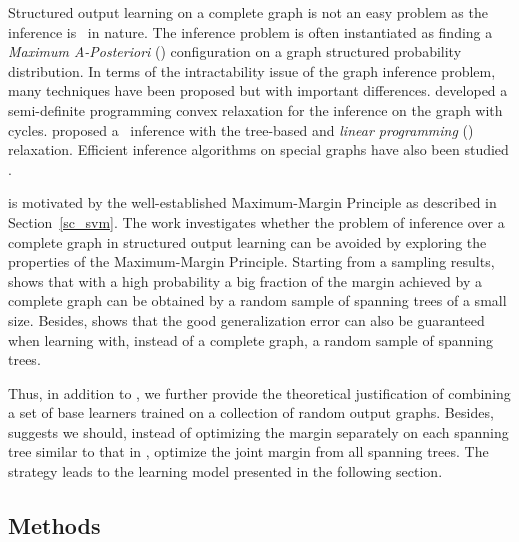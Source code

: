 {Structured output learning on a complete graph is not an easy problem as the inference is \nphard\ in nature.
The inference problem is often instantiated as finding a \textit{Maximum A-Posteriori} (\map) configuration on a graph structured probability distribution.
In terms of the intractability issue of the graph inference problem, many techniques have been proposed but with important differences.
\citet{Jordan04semiefinite} developed a semi-definite programming convex relaxation for the inference on the graph with cycles.
\citet{Wainwright05map} proposed a \map\ inference with the tree-based and \textit{linear programming} (\lp) relaxation.
Efficient inference algorithms on special graphs have also been studied \citep{Globerson07approximate}.

 is motivated by the well-established Maximum-Margin Principle as described in Section~\ref{sc_svm}.
The work investigates whether the problem of inference over a complete graph in structured output learning can be avoided by exploring the properties of the Maximum-Margin Principle.
Starting from a sampling results,  shows that with a high probability a big fraction of the margin achieved by a complete graph can be obtained by a random sample of spanning trees of a small size.
Besides,  shows that the good generalization error can also be guaranteed when learning with, instead of a complete graph, a random sample of spanning trees.

Thus, in addition to , we further provide the theoretical justification of combining a set of base learners trained on a collection of random output graphs. 
Besides,  suggests we should, instead of optimizing the margin separately on each spanning tree similar to that in \mam, optimize the joint margin from all spanning trees.
The strategy leads to the learning model presented in the following section.

\subsection{Methods}

}
